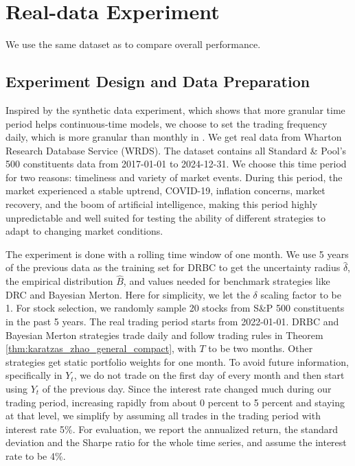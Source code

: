 \documentclass[11pt]{article}
\theoremstyle{definition}
\begin{document}
\section{Real-data Experiment}\label{real}
We use the same dataset as  \cite{BlanchetChenZhou2021} to compare overall performance.



\subsection{ Experiment Design and Data Preparation}
Inspired by the synthetic data experiment, which shows that more granular time period helps continuous-time models, we choose to set the trading frequency daily, which is more granular than monthly in \cite{BlanchetChenZhou2021}. We get real data from Wharton Research Database Service (WRDS). The dataset contains all Standard \& Pool's 500 constituents data from 2017-01-01 to 2024-12-31. We choose this time period for two reasons: timeliness and variety of market events. {During this period, the market experienced a stable uptrend, COVID-19, inflation concerns, market recovery, and the boom of artificial intelligence, making this period highly unpredictable and well suited for testing the ability of different strategies to adapt to changing market conditions. }

The experiment is done with a rolling time window of one month. We use 5 years of the previous data as the training set for DRBC to get the uncertainty radius $\hat{\delta}$, the empirical distribution $\hat{B}$, and values needed for benchmark strategies like DRC and Bayesian Merton. Here for simplicity, we let the $\delta$ scaling factor to be 1. For stock selection, we randomly sample 20 stocks from S\&P 500 constituents in the past 5 years. The real trading period starts from 2022-01-01. DRBC and Bayesian Merton strategies trade daily and follow trading rules in Theorem \ref{thm:karatzas_zhao_general_compact}, with $T$ to be two months. Other strategies get static portfolio weights for one month. To avoid future information, specifically in $Y_t$, we do not trade on the first day of every month and then start using $Y_t$ of the previous day. {Since the interest rate changed much during our trading period, increasing rapidly from about 0 percent to 5 percent and staying at that level,} we simplify by assuming all trades in the trading period with interest rate 5\%. For evaluation, we report the annualized return, the standard deviation and the Sharpe ratio for the whole time series, and assume the interest rate to be 4\%. 
\end{document}
